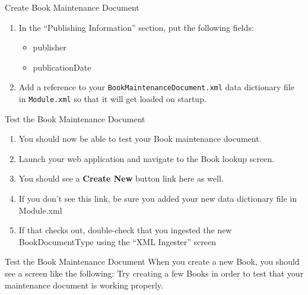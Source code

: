 \documentclass[xcolor=dvipsnames,14pt,professionalfonts]{beamer}
\begin{document}
\begin{frame}{Create Book Maintenance Document}
  \begin{enumerate}
  \item In the “Publishing Information” section, put the following fields:
      \begin{itemize}
      \item publisher
      \item publicationDate
\end{itemize}
\item Add a reference to your \texttt{BookMaintenanceDocument.xml} data
  dictionary file in \texttt{Module.xml} so that it will get loaded on startup.
  \end{enumerate}
\end{frame}
 
\begin{frame}{Test the Book Maintenance Document}
  \begin{enumerate}
  \item You should now be able to test your Book maintenance document.
  \item Launch your web application and navigate to the Book lookup screen.
  \item You should see a \textbf{Create New} button link here as well.
  \item If you don’t see this link, be sure you added your new data dictionary file in Module.xml
  \item If that checks out, double-check that you ingested the new BookDocumentType using the “XML Ingester” screen
    \end{enumerate}
  \end{frame}

\begin{frame}{Test the Book Maintenance Document}
   When you create a new Book, you should see a screen like the
    following:
    Try creating a few Books in order to test that your maintenance document is working properly.
  \end{frame}
\end{document}

